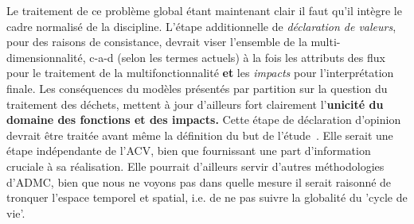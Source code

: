 Le traitement de ce problème global étant maintenant clair il faut qu'il intègre le cadre normalisé de la discipline.
L'étape additionnelle de \emph{déclaration de valeurs}, pour des raisons de consistance, devrait viser l'ensemble de la multi-dimensionnalité, c-a-d (selon les termes actuels) à la fois les attributs des flux pour le traitement de la multifonctionnalité \textbf{et} les \emph{impacts} pour l'interprétation finale.
Les conséquences du modèles présentés par partition sur la question du traitement des déchets, mettent à jour d'ailleurs fort clairement l'\textbf{unicité du domaine des fonctions et des impacts.}
Cette étape de déclaration d'opinion devrait être traitée avant même la définition du but de l'étude~\cite{patard_life_2015}.
Elle serait une étape indépendante de l'ACV, bien que fournissant une part d'information cruciale à sa réalisation.
Elle pourrait d'ailleurs servir d'autres méthodologies d'\gls{ADMC}, bien que nous ne voyons pas dans quelle mesure il serait raisonné de tronquer l'espace temporel et spatial, i.e. de ne pas suivre la globalité du 'cycle de vie'.

